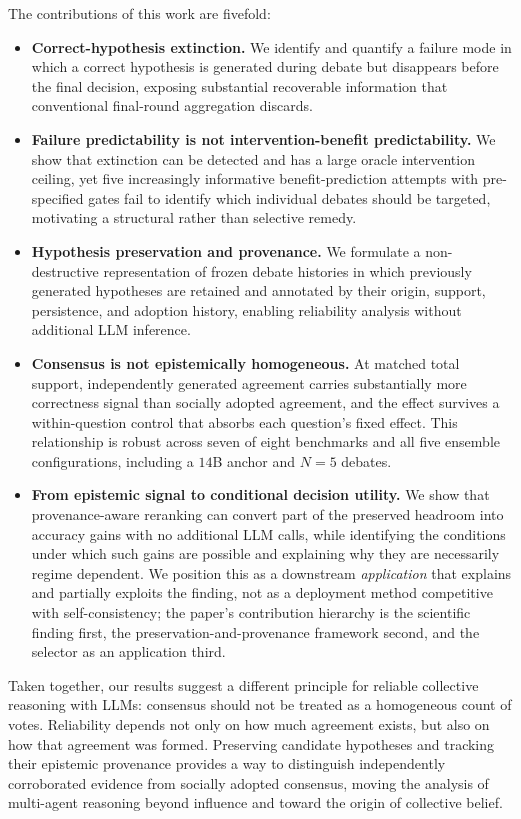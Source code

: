 The contributions of this work are fivefold:
\begin{itemize}
    \item \textbf{Correct-hypothesis extinction.} We identify and quantify a failure mode in which a correct hypothesis is generated during debate but disappears before the final decision, exposing substantial recoverable information that conventional final-round aggregation discards.
    \item \textbf{Failure predictability is not intervention-benefit predictability.} We show that extinction can be detected and has a large oracle intervention ceiling, yet five increasingly informative benefit-prediction attempts with pre-specified gates fail to identify which individual debates should be targeted, motivating a structural rather than selective remedy.
    \item \textbf{Hypothesis preservation and provenance.} We formulate a non-destructive representation of frozen debate histories in which previously generated hypotheses are retained and annotated by their origin, support, persistence, and adoption history, enabling reliability analysis without additional LLM inference.
    \item \textbf{Consensus is not epistemically homogeneous.} At matched total support, independently generated agreement carries substantially more correctness signal than socially adopted agreement, and the effect survives a within-question control that absorbs each question's fixed effect. This relationship is robust across seven of eight benchmarks and all five ensemble configurations, including a $14$B anchor and $N=5$ debates.
    \item \textbf{From epistemic signal to conditional decision utility.} We show that provenance-aware reranking can convert part of the preserved headroom into accuracy gains with no additional LLM calls, while identifying the conditions under which such gains are possible and explaining why they are necessarily regime dependent. We position this as a downstream \emph{application} that explains and partially exploits the finding, not as a deployment method competitive with self-consistency; the paper's contribution hierarchy is the scientific finding first, the preservation-and-provenance framework second, and the selector as an application third.
\end{itemize}

Taken together, our results suggest a different principle for reliable collective reasoning with LLMs: consensus should not be treated as a homogeneous count of votes. Reliability depends not only on how much agreement exists, but also on how that agreement was formed. Preserving candidate hypotheses and tracking their epistemic provenance provides a way to distinguish independently corroborated evidence from socially adopted consensus, moving the analysis of multi-agent reasoning beyond influence and toward the origin of collective belief.

